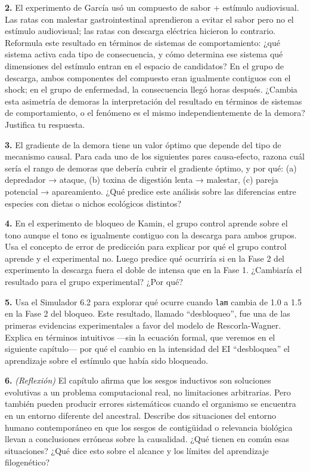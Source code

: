\documentclass[
  letterpaper,
  DIV=11,
  numbers=noendperiod]{scrreprt}
\begin{document}
\begin{tcolorbox}[enhanced jigsaw, toprule=.15mm, arc=.35mm, colback=white, opacityback=0, colframe=quarto-callout-note-color-frame, breakable, rightrule=.15mm, left=2mm, leftrule=.75mm, bottomrule=.15mm]
\textbf{2.} El experimento de García usó un compuesto de sabor +
estímulo audiovisual. Las ratas con malestar gastrointestinal
aprendieron a evitar el sabor pero no el estímulo audiovisual; las ratas
con descarga eléctrica hicieron lo contrario. Reformula este resultado
en términos de sistemas de comportamiento: ¿qué sistema activa cada tipo
de consecuencia, y cómo determina ese sistema qué dimensiones del
estímulo entran en el espacio de candidatos? En el grupo de descarga,
ambos componentes del compuesto eran igualmente contiguos con el shock;
en el grupo de enfermedad, la consecuencia llegó horas después. ¿Cambia
esta asimetría de demoras la interpretación del resultado en términos de
sistemas de comportamiento, o el fenómeno es el mismo independientemente
de la demora? Justifica tu respuesta.

\textbf{3.} El gradiente de la demora tiene un valor óptimo que depende
del tipo de mecanismo causal. Para cada uno de los siguientes pares
causa-efecto, razona cuál sería el rango de demoras que debería cubrir
el gradiente óptimo, y por qué: (a) depredador → ataque, (b) toxina de
digestión lenta → malestar, (c) pareja potencial → apareamiento. ¿Qué
predice este análisis sobre las diferencias entre especies con dietas o
nichos ecológicos distintos?

\textbf{4.} En el experimento de bloqueo de Kamin, el grupo control
aprende sobre el tono aunque el tono es igualmente contiguo con la
descarga para ambos grupos. Usa el concepto de error de predicción para
explicar por qué el grupo control aprende y el experimental no. Luego
predice qué ocurriría si en la Fase 2 del experimento la descarga fuera
el doble de intensa que en la Fase 1. ¿Cambiaría el resultado para el
grupo experimental? ¿Por qué?

\textbf{5.} Usa el Simulador 6.2 para explorar qué ocurre cuando
\texttt{lam} cambia de 1.0 a 1.5 en la Fase 2 del bloqueo. Este
resultado, llamado ``desbloqueo'', fue una de las primeras evidencias
experimentales a favor del modelo de Rescorla-Wagner. Explica en
términos intuitivos ---sin la ecuación formal, que veremos en el
siguiente capítulo--- por qué el cambio en la intensidad del EI
``desbloquea'' el aprendizaje sobre el estímulo que había sido
bloqueado.

\textbf{6.} \emph{(Reflexión)} El capítulo afirma que los sesgos
inductivos son soluciones evolutivas a un problema computacional real,
no limitaciones arbitrarias. Pero también pueden producir errores
sistemáticos cuando el organismo se encuentra en un entorno diferente
del ancestral. Describe dos situaciones del entorno humano contemporáneo
en que los sesgos de contigüidad o relevancia biológica llevan a
conclusiones erróneas sobre la causalidad. ¿Qué tienen en común esas
situaciones? ¿Qué dice esto sobre el alcance y los límites del
aprendizaje filogenético?


\end{tcolorbox}
\end{document}
